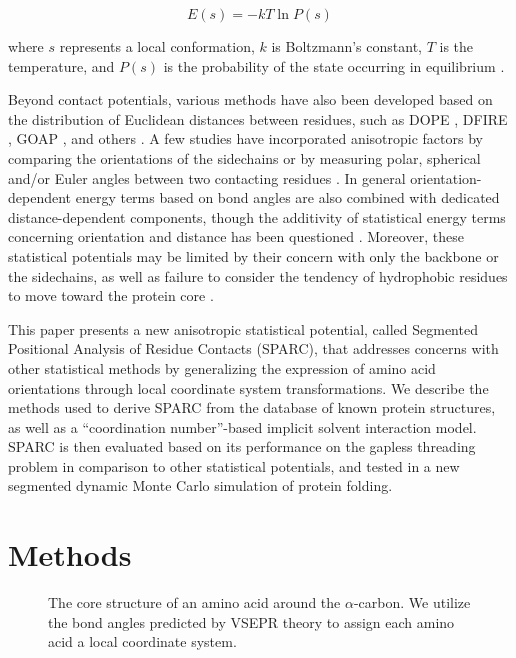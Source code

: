 \documentclass[11pt,titlepage]{article}
\begin{document}
\begin{equation}
E(s) = -kT\ln{P(s)}
\label{boltzmann_device}
\end{equation}

where $s$ represents a local conformation, $k$ is Boltzmann's constant, $T$ is the temperature, and $P(s)$ is the probability of the state occurring in equilibrium \cite{sippl}.

Beyond contact potentials, various methods have also been developed based on the distribution of Euclidean distances between residues, such as DOPE \cite{shen}, DFIRE \cite{zhou}, GOAP \cite{zhou2}, and others \cite{lu,zhang}.
A few studies have incorporated anisotropic factors by comparing the orientations of the sidechains \cite{zhang3,mukherjee} or by measuring polar, spherical and/or Euler angles between two contacting residues \cite{miyazawa2,buchete2003}. 
In general orientation-dependent energy terms based on bond angles are also combined with dedicated distance-dependent components, though the additivity of statistical energy terms concerning orientation and distance has been questioned \cite{shen}.
Moreover, these statistical potentials may be limited by their concern with only the backbone or the sidechains, as well as failure to consider the tendency of hydrophobic residues to move toward the protein core \cite{mullinax}.

This paper presents a new anisotropic statistical potential, called Segmented Positional Analysis of Residue Contacts (SPARC), that addresses concerns with other statistical methods by generalizing the expression of amino acid orientations through local coordinate system transformations.
We describe the methods used to derive SPARC from the database of known protein structures, as well as a ``coordination number''-based implicit solvent interaction model.
SPARC is then evaluated based on its performance on the gapless threading problem in comparison to other statistical potentials, and tested in a new segmented dynamic Monte Carlo simulation of protein folding.

\section{Methods}

\begin{figure}
	\begin{center}
	\end{center}
	\caption{The core structure of an amino acid around the $\alpha$-carbon. We utilize the bond angles predicted by VSEPR theory to assign each amino acid a local coordinate system.}
	\label{aminoacid_axes}
\end{figure}
\end{document}
